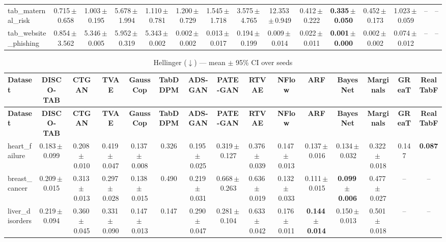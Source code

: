 \documentclass[8pt]{extarticle}
\begin{document}
\begin{longtable}{l*{14}{c}}
tab\_maternal\_risk & 0.715\,$\pm$\,0.658 & 1.003\,$\pm$\,0.195 & 5.678\,$\pm$\,1.994 & 1.110\,$\pm$\,0.781 & 1.200\,$\pm$\,0.729 & 1.545\,$\pm$\,1.718 & 3.575\,$\pm$\,4.765 & 12.353\,$\pm$\,0.949 & 0.412\,$\pm$\,0.222 & \textbf{0.335\,$\pm$\,0.050} & 0.452\,$\pm$\,0.173 & 1.023\,$\pm$\,0.059 & -- & -- \\
tab\_website\_phishing & 0.854\,$\pm$\,3.562 & 5.346\,$\pm$\,0.005 & 5.952\,$\pm$\,0.319 & 5.343\,$\pm$\,0.002 & 0.002\,$\pm$\,0.002 & 0.013\,$\pm$\,0.017 & 0.194\,$\pm$\,0.199 & 0.009\,$\pm$\,0.014 & 0.022\,$\pm$\,0.011 & \textbf{0.001\,$\pm$\,0.000} & 0.002\,$\pm$\,0.002 & 0.074\,$\pm$\,0.012 & -- & -- \\
\end{longtable}
\begin{longtable}{l*{14}{c}}
\caption{Hellinger ($\downarrow$) --- mean $\pm$ 95\% CI over seeds}\\
\toprule
\textbf{Dataset} & \textbf{DISCO-TAB} & \textbf{CTGAN} & \textbf{TVAE} & \textbf{GaussCop} & \textbf{TabDDPM} & \textbf{ADS-GAN} & \textbf{PATE-GAN} & \textbf{RTVAE} & \textbf{NFlow} & \textbf{ARF} & \textbf{BayesNet} & \textbf{Marginals} & \textbf{GReaT} & \textbf{RealTabF} \\
\midrule
\endfirsthead
\toprule
\textbf{Dataset} & \textbf{DISCO-TAB} & \textbf{CTGAN} & \textbf{TVAE} & \textbf{GaussCop} & \textbf{TabDDPM} & \textbf{ADS-GAN} & \textbf{PATE-GAN} & \textbf{RTVAE} & \textbf{NFlow} & \textbf{ARF} & \textbf{BayesNet} & \textbf{Marginals} & \textbf{GReaT} & \textbf{RealTabF} \\
\midrule
\endhead
\bottomrule
\endfoot
heart\_failure & 0.183\,$\pm$\,0.099 & 0.208\,$\pm$\,0.010 & 0.419\,$\pm$\,0.047 & 0.137\,$\pm$\,0.008 & 0.326 & 0.195\,$\pm$\,0.025 & 0.319\,$\pm$\,0.127 & 0.376\,$\pm$\,0.039 & 0.147\,$\pm$\,0.013 & 0.137\,$\pm$\,0.016 & 0.134\,$\pm$\,0.032 & 0.322\,$\pm$\,0.018 & 0.147 & \textbf{0.087} \\
breast\_cancer & 0.209\,$\pm$\,0.015 & 0.313\,$\pm$\,0.013 & 0.297\,$\pm$\,0.028 & 0.138\,$\pm$\,0.015 & 0.490 & 0.219\,$\pm$\,0.031 & 0.668\,$\pm$\,0.263 & 0.636\,$\pm$\,0.019 & 0.132\,$\pm$\,0.033 & 0.111\,$\pm$\,0.015 & \textbf{0.099\,$\pm$\,0.006} & 0.477\,$\pm$\,0.027 & -- & -- \\
liver\_disorders & 0.219\,$\pm$\,0.094 & 0.360\,$\pm$\,0.045 & 0.331\,$\pm$\,0.090 & 0.147\,$\pm$\,0.013 & 0.147 & 0.290\,$\pm$\,0.047 & 0.281\,$\pm$\,0.104 & 0.633\,$\pm$\,0.042 & 0.176\,$\pm$\,0.011 & \textbf{0.144\,$\pm$\,0.014} & 0.150\,$\pm$\,0.013 & 0.501\,$\pm$\,0.018 & -- & -- \\

\end{longtable}
\end{document}
